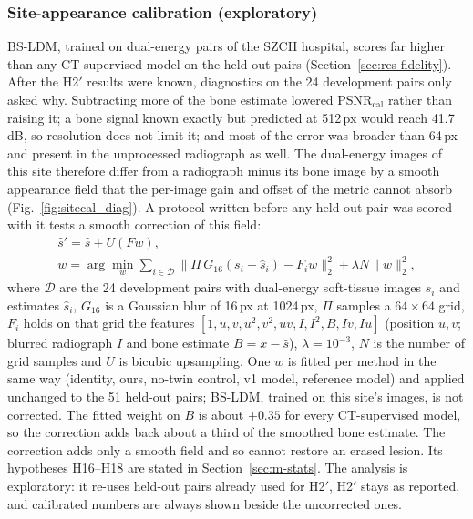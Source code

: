 \subsubsection{Site-appearance calibration (exploratory)}
\label{sec:m-sitecal}
BS-LDM, trained on dual-energy pairs of the SZCH hospital, scores far higher than any CT-supervised model on the held-out pairs
(Section~\ref{sec:res-fidelity}). After the H2$'$ results were known, diagnostics on the 24 development pairs only asked why. Subtracting
more of the bone estimate lowered PSNR$_{\mathrm{cal}}$ rather than raising it; a bone signal known exactly but predicted at 512\,px would
reach 41.7\,dB, so resolution does not limit it; and most of the error was broader than 64\,px and present in the unprocessed radiograph
as well. The dual-energy images of this site therefore differ from a radiograph minus its bone image by a smooth appearance field that the
per-image gain and offset of the metric cannot absorb (Fig.~\ref{fig:sitecal_diag}). A protocol written before any held-out pair was scored
with it tests a smooth correction of this field:
\begin{equation}
\begin{gathered}
\hat s'=\hat s+U(F w),\\
w=\arg\min_{w}\sum_{i\in\mathcal{D}}\big\lVert \Pi\,G_{16}(s_i-\hat s_i)-F_i w\big\rVert_2^2+\lambda N\lVert w\rVert_2^2,
\end{gathered}
\label{eq:sitecal}
\end{equation}
where $\mathcal{D}$ are the 24 development pairs with dual-energy soft-tissue images $s_i$ and estimates $\hat s_i$, $G_{16}$ is a Gaussian
blur of 16\,px at 1024\,px, $\Pi$ samples a $64\times64$ grid, $F_i$ holds on that grid the features $[1,u,v,u^2,v^2,uv,I,I^2,B,Iv,Iu]$
(position $u,v$; blurred radiograph $I$ and bone estimate $B=x-\hat s$), $\lambda=10^{-3}$, $N$ is the number of grid samples and $U$ is
bicubic upsampling. One $w$ is fitted per method in the same way (identity, ours, no-twin control, v1 model, reference model) and applied
unchanged to the 51 held-out pairs; BS-LDM, trained on this site's images, is not corrected. The fitted weight on $B$ is about $+0.35$ for
every CT-supervised model, so the correction adds back about a third of the smoothed bone estimate. The correction adds only a smooth field
and so cannot restore an erased lesion. Its hypotheses H16--H18 are stated in Section~\ref{sec:m-stats}. The analysis is exploratory: it
re-uses held-out pairs already used for H2$'$, H2$'$ stays as reported, and calibrated numbers are always shown beside the uncorrected ones.

